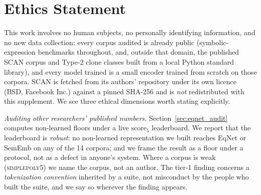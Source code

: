 
\section*{Ethics Statement}

This work involves no human subjects, no personally identifying information, and no new data collection: every corpus audited is already public (symbolic-expression benchmarks throughout, and, outside that domain, the published SCAN corpus \citep{lake2018generalization} and Type-2 clone classes built from a local Python standard library), and every model trained is a small encoder trained from scratch on those corpora. SCAN is fetched from its authors' repository under its own licence (BSD, Facebook Inc.) against a pinned SHA-256 and is \emph{not} redistributed with this supplement. We see three ethical dimensions worth stating explicitly.

\emph{Auditing other researchers' published numbers.} Section~\ref{sec:eqnet_audit} computes non-learned floors under a live $\mathrm{score}_5$ leaderboard. We report that the leaderboard is \emph{robust}: no non-learned representation we built reaches EqNet or SemEmb on any of the 14 corpora; and we frame the result as a floor under a protocol, not as a defect in anyone's system. Where a corpus is weak (\textsc{simplepoly5}) we name the corpus, not an author. The tier-1 finding concerns a \emph{tokenization convention} inherited by a suite, not misconduct by the people who built the suite, and we say so wherever the finding appears.

